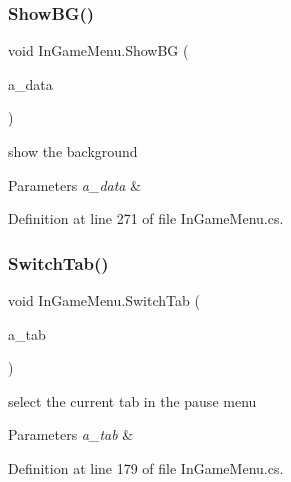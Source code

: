 \subsubsection{\texorpdfstring{Show\+B\+G()}{ShowBG()}}
{\footnotesize\ttfamily void In\+Game\+Menu.\+Show\+BG (\begin{DoxyParamCaption}\item[{Pointer\+Event\+Data}]{a\+\_\+data }\end{DoxyParamCaption})}



show the background 


\begin{DoxyParams}{Parameters}
{\em a\+\_\+data} & \\
\hline
\end{DoxyParams}


Definition at line 271 of file In\+Game\+Menu.\+cs.

\mbox{\label{class_in_game_menu_af70346b7177eacd7ae47dd20ec06b037}} 
\subsubsection{\texorpdfstring{Switch\+Tab()}{SwitchTab()}\hspace{0.1cm}{\footnotesize\ttfamily [1/2]}}
{\footnotesize\ttfamily void In\+Game\+Menu.\+Switch\+Tab (\begin{DoxyParamCaption}\item[{\mbox{\hyperlink{_in_game_menu_8cs_a87eb828d74fde9afa783aa42bfe61b96}{Tab\+Name}}}]{a\+\_\+tab }\end{DoxyParamCaption})}



select the current tab in the pause menu 


\begin{DoxyParams}{Parameters}
{\em a\+\_\+tab} & \\
\hline
\end{DoxyParams}


Definition at line 179 of file In\+Game\+Menu.\+cs.

\mbox{\label{class_in_game_menu_abcbcdfc565a34ce1c14499eac852befb}} 
